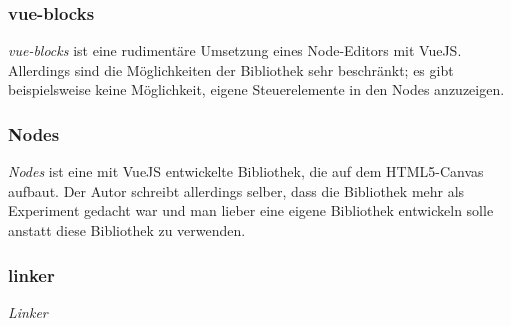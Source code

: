 \subsubsection*{vue-blocks}
\textit{vue-blocks} ist eine rudimentäre Umsetzung eines Node-Editors mit VueJS. Allerdings sind die Möglichkeiten der Bibliothek sehr beschränkt; es gibt beispielsweise keine Möglichkeit, eigene Steuerelemente in den Nodes anzuzeigen.

\subsubsection*{Nodes}
\textit{Nodes} ist eine mit VueJS entwickelte Bibliothek, die auf dem HTML5-Canvas aufbaut. Der Autor schreibt allerdings selber, dass die Bibliothek mehr als Experiment gedacht war und man lieber eine eigene Bibliothek entwickeln solle anstatt diese Bibliothek zu verwenden.

\subsubsection*{linker}
\textit{Linker} 